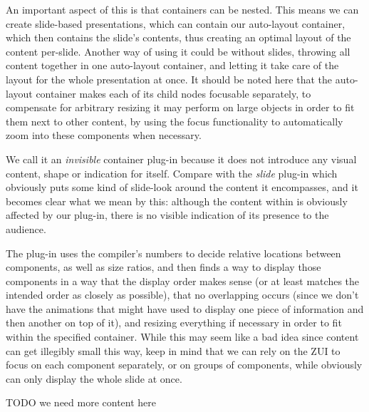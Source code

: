    An important aspect of this is that containers can be nested. This means we
   can create slide-based presentations, which can contain our auto-layout
   container, which then contains the slide's contents, thus creating an
   optimal layout of the content per-slide. Another way of using it could be
   without slides, throwing all content together in one auto-layout container,
   and letting it take care of the layout for the whole presentation at once.
   It should be noted here that the auto-layout container makes each of its
   child nodes focusable separately, to compensate for arbitrary resizing it
   may perform on large objects in order to fit them next to other content, by
   using the focus functionality to automatically zoom into these components
   when necessary.
  
   We call it an \emph{invisible} container plug-in because it does not
   introduce any visual content, shape or indication for itself. Compare with
   the \emph{slide} plug-in which obviously puts some kind of slide-look around
   the content it encompasses, and it becomes clear what we mean by this:
   although the content within is obviously affected by our plug-in, there is
   no visible indication of its presence to the audience.

   The plug-in uses the compiler's numbers to decide relative locations between
   components, as well as size ratios, and then finds a way to display those
   components in a way that the display order makes sense (or at least matches
   the intended order as closely as possible), that no overlapping occurs
   (since we don't have the animations that \ppt might have used to display one
   piece of information and then another on top of it), and resizing everything
   if necessary in order to fit within the specified container. While this may
   seem like a bad idea since content can get illegibly small this way, keep in
   mind that we can rely on the ZUI to focus on each component separately, or
   on groups of components, while \ppt obviously can only display the whole
   slide at once.

   TODO we need more content here

